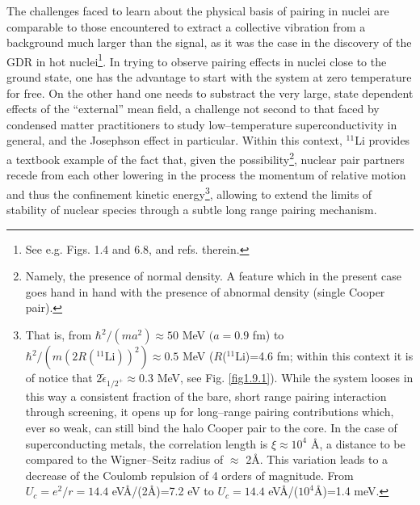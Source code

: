 The challenges faced to learn about the physical basis of pairing in nuclei are comparable to those encountered to extract a   collective vibration from a background much larger than the signal, as it was the case  in the discovery of the GDR in hot nuclei\footnote{See e.g. \cite{Bortignon:98} Figs. 1.4 and 6.8, and refs. therein.}. In trying to observe  pairing effects in nuclei close to the ground state, one has the advantage to start with the system at zero temperature for free. On the other hand one needs to substract the very large, state dependent effects of the ``external'' mean field, a challenge not second to that faced by condensed matter practitioners to study low--temperature superconductivity in general, and the Josephson effect in particular.  Within this context, $^{11}$Li provides a textbook example of the fact that, given the possibility\footnote{Namely, the presence of normal density. A feature which in the present case goes hand in hand with the presence of abnormal density (single Cooper pair).}, nuclear pair partners recede from each other lowering in the process the momentum of relative motion and thus the confinement kinetic energy\footnote{That is, from $\hbar^2/(ma^2)\approx 50$ MeV $(a=0.9$ fm) to $\hbar^2/(m(2R(^{11}\text{Li}))^2)\approx 0.5$ MeV ($R$($^{11}$Li)=4.6 fm; within this context it is of notice that $2\tilde{\epsilon}_{1/2^+}\approx0.3$ MeV, see Fig. \ref{fig1.9.1}). While the system looses in this way a consistent fraction of the bare, short range pairing interaction through screening, it opens up for long--range pairing contributions which, ever so weak, can still bind the halo Cooper pair to the core. In the case of superconducting metals, the correlation length is $\xi\approx 10^4$ \AA, a distance to be compared to the Wigner--Seitz radius of $\approx$ 2\AA. This variation leads to a decrease of the Coulomb repulsion of 4 orders of magnitude. From $U_c=e^2/r=14.4$ eV\AA/(2\AA)=7.2 eV to $U_c=14.4$ eV\AA/($10^4$\AA)=1.4 meV.}, allowing to extend the limits of stability of nuclear species through a subtle long range pairing mechanism. 


